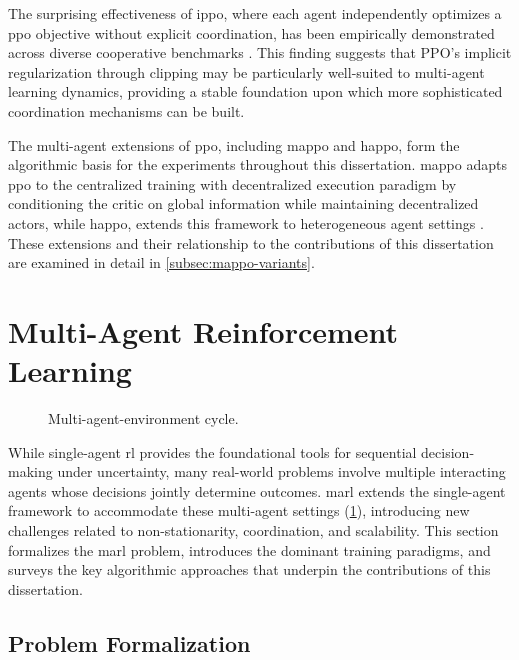 The surprising effectiveness of \gls{ippo}, where each agent independently 
optimizes a \gls{ppo} objective without explicit coordination, has been 
empirically demonstrated across diverse cooperative benchmarks \cite{yu2022}. 
This finding suggests that PPO's implicit regularization through clipping may be 
particularly well-suited to multi-agent learning dynamics, providing a stable 
foundation upon which more sophisticated coordination mechanisms can be built.

The multi-agent extensions of \gls{ppo}, including \gls{mappo} and \gls{happo},
form the algorithmic basis for the experiments throughout this dissertation. 
\Gls{mappo} adapts \gls{ppo} to the centralized training with decentralized 
execution paradigm by conditioning the critic on global information while 
maintaining decentralized actors, while \gls{happo}, extends 
this framework to heterogeneous agent settings \cite{zhong2024}. 
These extensions and their relationship to the contributions of this 
dissertation are examined in detail in \cref{subsec:mappo-variants}.

\section{Multi-Agent Reinforcement Learning}
\label{sec:marl-fundamentals}

\begin{figure}
    \centering
    
    \caption{Multi-agent-environment cycle.}
    \label{fig:mae_cycle}
\end{figure}

While single-agent \gls{rl} provides the foundational tools for sequential 
decision-making under uncertainty, many real-world problems involve 
multiple interacting agents whose decisions jointly determine outcomes. 
\Gls{marl} extends the single-agent framework to accommodate these 
multi-agent settings (\cref{fig:mae_cycle}), introducing new challenges 
related to non-stationarity, coordination, and scalability. This section 
formalizes the \gls{marl} problem, introduces the dominant training paradigms, 
and surveys the key algorithmic approaches that underpin the contributions 
of this dissertation.

\subsection{Problem Formalization}
\label{subsec:marl-formalization}

